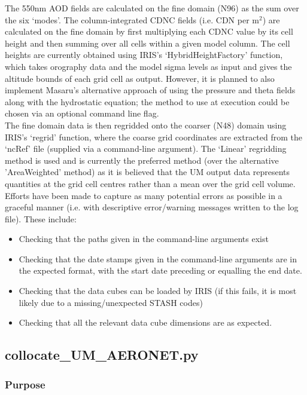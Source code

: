 \documentclass[10pt,a4paper]{article}
\begin{document}
\noindent The 550nm AOD fields are calculated on the fine domain (N96) as the sum over the six `modes'. The column-integrated CDNC fields (i.e. CDN per m$^2$) are calculated on the fine domain by first multiplying each CDNC value by its cell height and then summing over all cells within a given model column. The cell heights are currently obtained using IRIS's `HybridHeightFactory' function, which takes orography data and the model sigma levels as input and gives the altitude bounds of each grid cell as output. However, it is planned to also implement Masaru's alternative approach of using the pressure and theta fields along with the hydrostatic equation; the method to use at execution could be chosen via an optional command line flag.\\

\noindent The fine domain data is then regridded onto the coarser (N48) domain using IRIS's `regrid' function, where the coarse grid coordinates are extracted from the `ncRef' file (supplied via a command-line argument). The `Linear' regridding method is used and is currently the preferred method (over the alternative 'AreaWeighted' method) as it is believed that the UM output data represents quantities at the grid cell centres rather than a mean over the grid cell volume.\\

\noindent Efforts have been made to capture as many potential errors as possible in a graceful manner (i.e. with descriptive error/warning messages written to the log file). These include:
\begin{itemize}
\item Checking that the paths given in the command-line arguments exist
\item Checking that the date stamps given in the command-line arguments are in the expected format, with the start date preceding or equalling the end date.
\item Checking that the data cubes can be loaded by IRIS (if this fails, it is most likely due to a missing/unexpected STASH codes)
\item Checking that all the relevant data cube dimensions are as expected.
\end{itemize}

\subsection{collocate\_UM\_AERONET.py}

\subsubsection{Purpose}
\end{document}
